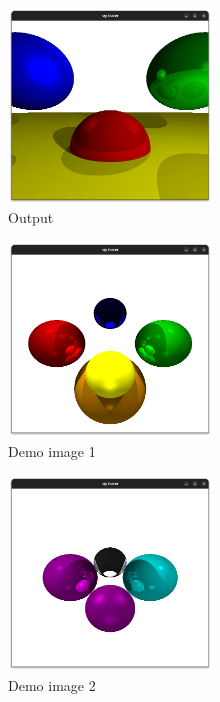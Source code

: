\documentclass[conference]{IEEEtran}
\begin{document}
\begin{figure}[htbp]
  \centerline{\includegraphics[width=0.48\textwidth]{./figs/output.png}}
  \caption{Output}
  \label{output}
\end{figure}


\begin{figure}[htbp]
  \centerline{\includegraphics[width=0.48\textwidth]{./figs/demo1.png}}
  \caption{Demo image 1}
  \label{demo1}
\end{figure}

\begin{figure}[htbp]
  \centerline{\includegraphics[width=0.48\textwidth]{./figs/demo2.png}}
  \caption{Demo image 2}
  \label{demo2}
\end{figure}
\end{document}
